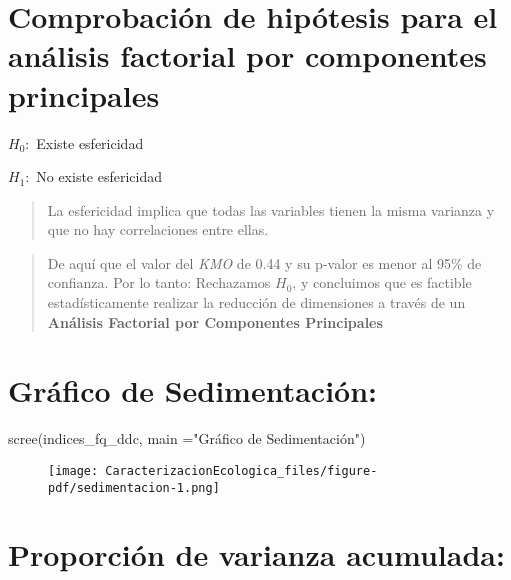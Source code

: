 \documentclass[
  10pt,
  letterpaper,
  DIV=11,
  numbers=noendperiod]{scrreprt}
\newenvironment{Shaded}{\begin{snugshade}}{\end{snugshade}}
\newcommand{\AttributeTok}[1]{\textcolor[rgb]{0.40,0.45,0.13}{#1}}
\newcommand{\FunctionTok}[1]{\textcolor[rgb]{0.28,0.35,0.67}{#1}}
\newcommand{\NormalTok}[1]{\textcolor[rgb]{0.00,0.23,0.31}{#1}}
\newcommand{\StringTok}[1]{\textcolor[rgb]{0.13,0.47,0.30}{#1}}
\begin{document}
\hypertarget{comprobaciuxf3n-de-hipuxf3tesis-para-el-anuxe1lisis-factorial-por-componentes-principales}{%
\section{Comprobación de hipótesis para el análisis factorial por
componentes
principales}\label{comprobaciuxf3n-de-hipuxf3tesis-para-el-anuxe1lisis-factorial-por-componentes-principales}}

\(H_{0}:\) Existe esfericidad

\(H_{1}:\) No existe esfericidad

\begin{quote}
La esfericidad implica que todas las variables tienen la misma varianza
y que no hay correlaciones entre ellas.
\end{quote}

\begin{quote}
De aquí que el valor del \emph{KMO} de 0.44 y su p-valor es menor al
95\% de confianza. Por lo tanto: Rechazamos \(H_{0}\), y concluimos que
es factible estadísticamente realizar la reducción de dimensiones a
través de un \textbf{Análisis Factorial por Componentes Principales}
\end{quote}

\hypertarget{gruxe1fico-de-sedimentaciuxf3n}{%
\section{Gráfico de
Sedimentación:}\label{gruxe1fico-de-sedimentaciuxf3n}}

\begin{Shaded}
\begin{Highlighting}[numbers=left,,]
\FunctionTok{scree}\NormalTok{(indices\_fq\_ddc,}
      \AttributeTok{main =}\StringTok{"Gráfico de Sedimentación"}\NormalTok{)}
\end{Highlighting}
\end{Shaded}

\begin{figure}[tb]

{\centering \texttt{[image: CaracterizacionEcologica\_files/figure-pdf/sedimentacion-1.png]}

}

\end{figure}

\hypertarget{proporciuxf3n-de-varianza-acumulada}{%
\section{Proporción de varianza
acumulada:}\label{proporciuxf3n-de-varianza-acumulada}}
\end{document}

